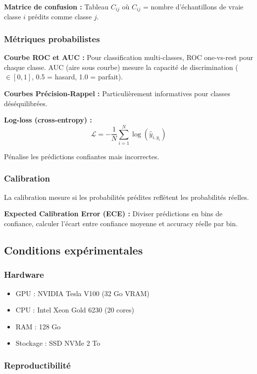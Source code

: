 \textbf{Matrice de confusion :}
Tableau $C_{ij}$ où $C_{ij}$ = nombre d'échantillons de vraie classe $i$ prédits comme classe $j$.

\subsubsection{Métriques probabilistes}

\textbf{Courbe ROC et AUC :}
Pour classification multi-classes, ROC one-vs-rest pour chaque classe. AUC (aire sous courbe) mesure la capacité de discrimination ($\in [0,1]$, 0.5 = hasard, 1.0 = parfait).

\textbf{Courbes Précision-Rappel :}
Particulièrement informatives pour classes déséquilibrées.

\textbf{Log-loss (cross-entropy) :}
\[
\mathcal{L} = -\frac{1}{N}\sum_{i=1}^N \log(\hat{y}_{i, y_i})
\]

Pénalise les prédictions confiantes mais incorrectes.

\subsubsection{Calibration}

La calibration mesure si les probabilités prédites reflètent les probabilités réelles.

\textbf{Expected Calibration Error (ECE) :}
Diviser prédictions en bins de confiance, calculer l'écart entre confiance moyenne et accuracy réelle par bin.

\subsection{Conditions expérimentales}

\subsubsection{Hardware}

\begin{itemize}
    \item GPU : NVIDIA Tesla V100 (32 Go VRAM)
    \item CPU : Intel Xeon Gold 6230 (20 cores)
    \item RAM : 128 Go
    \item Stockage : SSD NVMe 2 To
\end{itemize}

\subsubsection{Reproductibilité}


